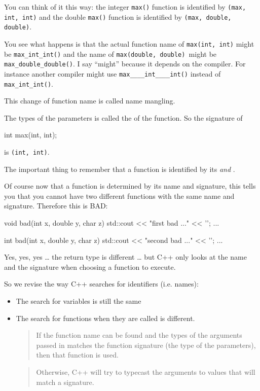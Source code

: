 You can think of it this way: the integer \texttt{max()} function is identified by \texttt{(max, int, int)} and the double \texttt{max()} function is identified by \texttt{(max, double, double)}.

You see what happens is that the actual function name of \texttt{max(int, int)} might be \texttt{max\_int\_int()} and the name of \texttt{max(double, double) }might be \texttt{max\_double\_double()}. I say ``might'' because it depends on the compiler. For instance another compiler might use \texttt{max\_\_\_\_int\_\_\_\_int()} instead of \texttt{max\_int\_int()}.

This change of function name is called name mangling.

The types of the parameters is called the  of the function. So the signature of

\begin{consolethree}[escapeinside=||]
int max(int, int);
\end{consolethree}

is \texttt{(int, int)}.

The important thing to remember that a function is identified by its  \textit{and} .

Of course now that a function is determined by its name and signature, this tells you that you cannot have two different functions with the same name and signature. Therefore this is BAD:

\begin{consolethree}[escapeinside=||]
void bad(int x, double y, char z)
{
    std::cout << "first bad ..." << '\n';
    ...
}

int bad(int x, double y, char z)
{
    std::cout << "second bad ..." << '\n';
    ...
}
\end{consolethree}

Yes, yes, yes \ldots{} the return type is different \ldots{} but C++ only looks at the name and the signature when choosing a function to execute.

So we revise the way C++ searches for identifiers (i.e. names):

\begin{itemize}
\item The search for variables is still the same
\item The search for functions when they are called is different.
  \begin{quote}
  If the function name can be found and the types of the arguments
  passed in matches the function signature (the type of the parameters),
  then that function is used.
  \end{quote}
  \begin{quote}
  Otherwise, C++ will try to typecast the arguments to values that will
  match a signature.
  \end{quote}
\end{itemize}

